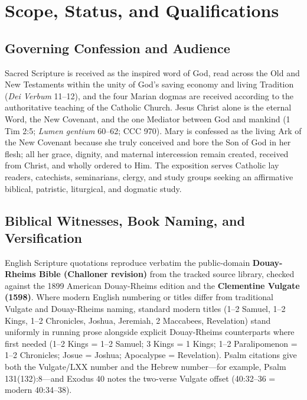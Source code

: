 \section{Scope, Status, and Qualifications}

\subsection{Governing Confession and Audience}

Sacred Scripture is received as the inspired word of God, read across the Old and New Testaments within the unity of God's saving economy and living Tradition (\textit{Dei Verbum} 11--12), and the four Marian dogmas are received according to the authoritative teaching of the Catholic Church. Jesus Christ alone is the eternal Word, the New Covenant, and the one Mediator between God and mankind (1 Tim 2:5; \textit{Lumen gentium} 60--62; CCC 970). Mary is confessed as the living Ark of the New Covenant because she truly conceived and bore the Son of God in her flesh; all her grace, dignity, and maternal intercession remain created, received from Christ, and wholly ordered to Him. The exposition serves Catholic lay readers, catechists, seminarians, clergy, and study groups seeking an affirmative biblical, patristic, liturgical, and dogmatic study.

\subsection{Biblical Witnesses, Book Naming, and Versification}

English Scripture quotations reproduce verbatim the public-domain \textbf{Douay-Rheims Bible (Challoner revision)} from the tracked source library, checked against the 1899 American Douay-Rheims edition and the \textbf{Clementine Vulgate (1598)}. Where modern English numbering or titles differ from traditional Vulgate and Douay-Rheims naming, standard modern titles (1--2 Samuel, 1--2 Kings, 1--2 Chronicles, Joshua, Jeremiah, 2 Maccabees, Revelation) stand uniformly in running prose alongside explicit Douay-Rheims counterparts where first needed (1--2 Kings = 1--2 Samuel; 3 Kings = 1 Kings; 1--2 Paralipomenon = 1--2 Chronicles; Josue = Joshua; Apocalypse = Revelation). Psalm citations give both the Vulgate/LXX number and the Hebrew number---for example, Psalm 131(132):8---and Exodus 40 notes the two-verse Vulgate offset (40:32--36 = modern 40:34--38).

